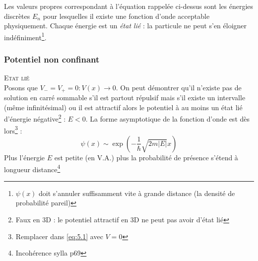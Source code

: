 \documentclass[british,french,11pt, a4paper, openany]{book}
\begin{document}
	Les valeurs propres correspondant à l'équation rappelée ci-dessus sont les énergies discrètes $E_n$ pour lesquelles il existe une fonction d'onde acceptable physiquement. Chaque énergie est un \textit{état lié} : la particule ne peut s'en éloigner indéfiniment\footnote{$\psi(x)$ doit s'annuler suffisamment vite à grande distance (la densité de probabilité pareil)}.
	
	\subsubsection*{Potentiel non confinant}
	\textsc{Etat lié}\\
	Posons que $V_- = V_+ = 0 : V(x) \rightarrow 0$. On peut démontrer qu'il n'existe pas de solution en carré sommable s'il est partout répulsif mais s'il existe un intervalle (même infinitésimal) ou il est attractif alors le potentiel à au moins un état lié d'énergie négative\footnote{Faux en 3D : le potentiel attractif en 3D ne peut pas avoir d'état lié} : $E <0$. La forme asymptotique de la fonction d'onde est dès lors\footnote{Remplacer dans \eqref{eq:5.1} avec $V=0$} :
	\begin{equation}
		\psi(x) \sim \exp\left(-\frac{1}{\hbar}\sqrt{2m|E|}x\right)
	\end{equation}
	Plus l'énergie $E$ est petite (en V.A.) plus la probabilité de présence s'étend à longueur distance\footnote{Incohérence sylla p69}\\
	
\end{document}
